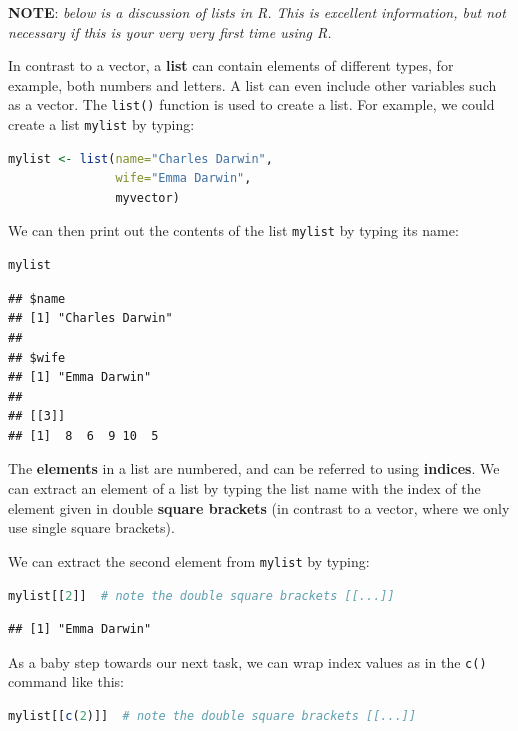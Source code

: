\documentclass[
]{book}
\newcommand{\passthrough}[1]{#1}
\begin{document}
\textbf{NOTE}: \emph{below is a discussion of lists in R. This is excellent information, but not necessary if this is your very very first time using R.}

In contrast to a vector, a \textbf{list} can contain elements of different types, for example, both numbers and letters. A list can even include other variables such as a vector. The \passthrough{\lstinline!list()!} function is used to create a list. For example, we could create a list \passthrough{\lstinline!mylist!} by typing:

\begin{lstlisting}[language=R]
mylist <- list(name="Charles Darwin", 
               wife="Emma Darwin", 
               myvector)
\end{lstlisting}

We can then print out the contents of the list \passthrough{\lstinline!mylist!} by typing its name:

\begin{lstlisting}[language=R]
mylist
\end{lstlisting}

\begin{lstlisting}
## $name
## [1] "Charles Darwin"
## 
## $wife
## [1] "Emma Darwin"
## 
## [[3]]
## [1]  8  6  9 10  5
\end{lstlisting}

The \textbf{elements} in a list are numbered, and can be referred to using \textbf{indices}. We can extract an element of a list by typing the list name with the index of the element given in double \textbf{square brackets} (in contrast to a vector, where we only use single square brackets).

We can extract the second element from \passthrough{\lstinline!mylist!} by typing:

\begin{lstlisting}[language=R]
mylist[[2]]  # note the double square brackets [[...]]
\end{lstlisting}

\begin{lstlisting}
## [1] "Emma Darwin"
\end{lstlisting}

As a baby step towards our next task, we can wrap index values as in the \passthrough{\lstinline!c()!} command like this:

\begin{lstlisting}[language=R]
mylist[[c(2)]]  # note the double square brackets [[...]]
\end{lstlisting}
\end{document}
